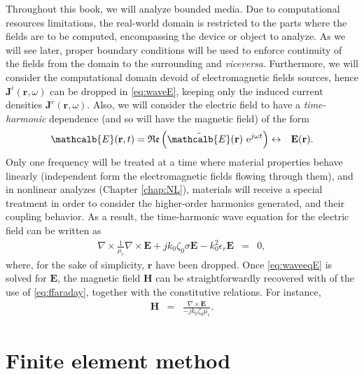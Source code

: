 Throughout this book, we will analyze bounded media. Due to computational resources limitations, the real-world domain is restricted to the parts where the fields are to be computed, encompassing the device or object to analyze. As we will see later, proper boundary conditions will be used to enforce continuity of the fields from the domain to the surrounding and \textit{viceversa}. Furthermore, we will consider the computational domain devoid of electromagnetic fields sources, hence ${\mathbf{J}^i}(\mathbf{r},\omega)$ can be dropped in \eqref{eq:waveE}, keeping only the induced current densities ${\mathbf{J}^c}(\mathbf{r},\omega)$. Also, we will consider the electric field to have a \textit{time-harmonic} dependence (and so will have the magnetic field) of the form
\begin{eqnarray}
\mathcalb{E}(\mathbf{r},t) =  \mathfrak{Re} \left( \tilde{\mathcalb{E}}(\mathbf{r}) \ \exp{j\omega t} \right) &\leftrightarrow &{\mathbf{E}(\mathbf{r})}. \label{eq:waveHarmE}
\end{eqnarray}
\noindent Only one frequency will be treated at a time where material properties behave linearly (independent form the electromagnetic fields flowing through them), and in nonlinear analyzes (Chapter \ref{chap:NL}), materials will receive a special treatment in order to consider the higher-order harmonics generated, and their coupling behavior. As a result, the time-harmonic wave equation for the electric field can be written as
\begin{eqnarray}
\nabla \times \frac{1}{\mu_r} \nabla \times {\mathbf{E}} + j k_0 \zeta_0 \sigma {\mathbf{E}} - k_0^2 \epsilon_r {\mathbf{E}} &= & 0, \label{eq:waveeqE}
\end{eqnarray}
\noindent where, for the sake of simplicity, $\mathbf{r}$ have been dropped. Once \eqref{eq:waveeqE} is solved for $\mathbf{E}$, the magnetic field $\mathbf{H}$ can be straightforwardly recovered with of the use of \eqref{eq:ffaraday}, together with the constitutive relations. For instance,
\begin{eqnarray}
{\mathbf{H}} &= & \frac{\nabla \times {\mathbf{E}}}{-j k_0\zeta_0\mu_r}.  \label{eq:waveeqErecH}
\end{eqnarray}

\section{Finite element method}

